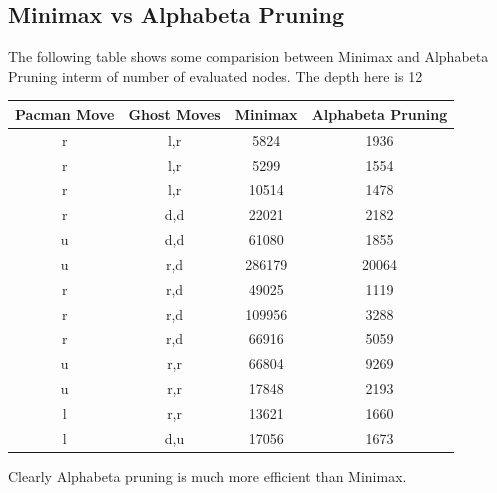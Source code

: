 \documentclass[a4paper, 11pt]{article}
\begin{document}
\subsection{Minimax vs Alphabeta Pruning}
The following table shows some comparision between Minimax and Alphabeta Pruning interm of number of evaluated nodes. The depth here is 12
\begin{table}[ht]
\centering
\begin{tabular}{|c|c|c|c|}
\hline
Pacman Move & Ghost Moves & Minimax & Alphabeta Pruning \\ \hline
r           & l,r         & 5824    & 1936              \\ \hline
r           & l,r         & 5299    & 1554              \\ \hline
r           & l,r         & 10514   & 1478              \\ \hline
r           & d,d         & 22021   & 2182              \\ \hline
u           & d,d         & 61080   & 1855              \\ \hline
u           & r,d         & 286179  & 20064             \\ \hline
r           & r,d         & 49025   & 1119              \\ \hline
r           & r,d         & 109956  & 3288              \\ \hline
r           & r,d         & 66916   & 5059              \\ \hline
u           & r,r         & 66804   & 9269              \\ \hline 
u           & r,r         & 17848   & 2193              \\ \hline
l           & r,r         & 13621   & 1660              \\ \hline
l           & d,u         & 17056   & 1673              \\ 
\hline
\end{tabular}
\end{table}

Clearly Alphabeta pruning is much more efficient than Minimax. 
\end{document}
